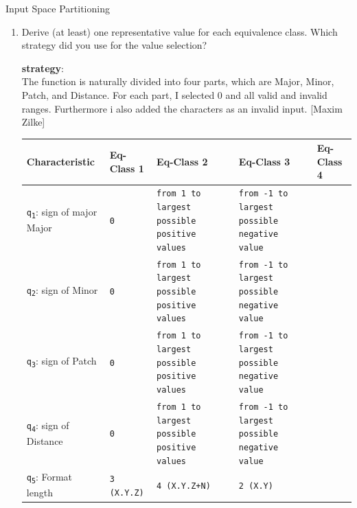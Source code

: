 \documentclass[a4paper]{scrreprt}
\newcounter{question}
\begin{document}
\begin{question}{Input Space Partitioning}
\begin{enumerate}[topsep=0pt, leftmargin=*]
\begin{answer}
          \end{answer}
    \item Derive (at least) one representative value for each equivalence class. Which strategy did you use for the value selection?
          \begin{answer}
\textbf{strategy}: \\
The function is naturally divided into four parts, which are Major, Minor, Patch, and Distance. For each part, I selected 0 and all valid and invalid ranges. Furthermore i also added the characters as an invalid input. [Maxim Zilke]

\vspace{1em}
\centering
\small
\renewcommand{\arraystretch}{1.2}
\begin{tabular}{|p{2.5cm}|p{2.5cm}|p{2.5cm}|p{2.5cm}|p{2.5cm}|}
\hline
\textbf{Characteristic} & \textbf{Eq-Class 1} & \textbf{Eq-Class 2} & \textbf{Eq-Class 3} & \textbf{Eq-Class 4} \\
\hline

\texttt{q\textsubscript{1}}: sign of major Major & \texttt{0} & \texttt{from 1 to largest possible positive values} & \texttt{from -1 to largest possible negative value} & \texttt{}\\
\hline

\texttt{q\textsubscript{2}}: sign of Minor & \texttt{0} & \texttt{from 1 to largest possible positive values} & \texttt{from -1 to largest possible negative value}& \texttt{}\\
\hline

\texttt{q\textsubscript{3}}: sign of Patch & \texttt{0} & \texttt{from 1 to largest possible positive values} & \texttt{from -1 to largest possible negative value}& \texttt{} \\
\hline

\texttt{q\textsubscript{4}}: sign of Distance & \texttt{0} & \texttt{from 1 to largest possible positive values} & \texttt{from -1 to largest possible negative value} & \texttt{} \\
\hline

\texttt{q\textsubscript{5}}: Format length & \texttt{3 (X.Y.Z)} & \texttt{4 (X.Y.Z+N)} & \texttt{2 (X.Y)} & \texttt{}\\
\hline


\end{tabular}
\end{answer}
\end{enumerate}
\end{question}
\end{document}
